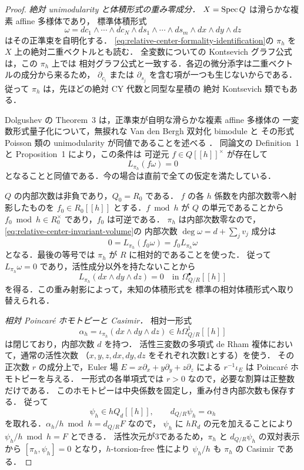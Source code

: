 \begin{proof}
\emph{絶対 unimodularity と体積形式の重み零成分．}
$X=\operatorname{Spec} Q$ は滑らかな複素 affine 多様体であり，
標準体積形式
\[
 \omega=dc_1\wedge\cdots\wedge dc_N
       \wedge ds_1\wedge\cdots\wedge ds_m
       \wedge dx\wedge dy\wedge dz
\]
はその正準束を自明化する．
\eqref{eq:relative-center-formality-identification}の $\pi_h$ を
$X$ 上の絶対二重ベクトルとも読む．
全変数についての Kontsevich グラフ公式は，この $\pi_h$ 上では
相対グラフ公式と一致する．各辺の微分添字は二重ベクトルの成分から来るため，
$\partial_{c_i}$ または $\partial_{s_j}$ を含む項が一つも生じないからである．
従って $\pi_h$ は，先ほどの絶対 CY 代数と同型な星積の
絶対 Kontsevich 類でもある．

Dolgushev の Theorem~3 は，正準束が自明な滑らかな複素 affine 多様体の
一変数形式量子化について，無捩れな Van den Bergh 双対化 bimodule と
その形式 Poisson 類の unimodularity が同値であることを述べる
\cite[Theorem~3]{DolgushevModular2009}．
同論文の Definition~1 と Proposition~1 により，この条件は
可逆元 $f\in Q[[h]]^\times$ が存在して
\begin{equation}\label{eq:relative-center-invariant-volume}
 L_{\pi_h}(f\omega)=0
\end{equation}
となることと同値である．今の場合は直前で全ての仮定を満たしている．

$Q$ の内部次数は非負であり，$Q_0=R_0$ である．
$f$ の各 $h$ 係数を内部次数零へ射影したものを
$f_0\in R_0[[h]]$ とする．$f\bmod h$ が $Q$ の単元であることから
$f_0\bmod h\in R_0^\times$ であり，$f_0$ は可逆である．
$\pi_h$ は内部次数零なので，\eqref{eq:relative-center-invariant-volume}の
内部次数 $\deg\omega=d+\sum_jv_j$ 成分は
\[
 0=L_{\pi_h}(f_0\omega)=f_0L_{\pi_h}\omega
\]
となる．最後の等号では $\pi_h$ が $R$ に相対的であることを使った．
従って $L_{\pi_h}\omega=0$ であり，活性成分以外を持たないことから
\[
 L_{\pi_h}(dx\wedge dy\wedge dz)=0
 \quad\text{in }\Omega^\bullet_{Q/R}[[h]]
\]
を得る．この重み射影によって，未知の体積形式を
標準の相対体積形式へ取り替えられる．

\emph{相対 Poincar\'e ホモトピーと Casimir．}
相対一形式
\[
 \alpha_h=\iota_{\pi_h}(dx\wedge dy\wedge dz)
     \in h\Omega^1_{Q/R}[[h]]
\]
は閉じており，内部次数 $d$ を持つ．
活性三変数の多項式 de Rham 複体において，通常の活性次数
（$x,y,z,dx,dy,dz$ をそれぞれ次数1とする）を使う．
その正次数 $r$ の成分上で，Euler 場
$E=x\partial_x+y\partial_y+z\partial_z$ による
$r^{-1}\iota_E$ は Poincar\'e ホモトピーを与える．
一形式の各単項式では $r>0$ なので，必要な割算は正整数だけである．
このホモトピーは中央係数を固定し，重み付き内部次数も保存する．
従って
\[
 \psi_h\in hQ_d[[h]],\qquad d_{Q/R}\psi_h=\alpha_h
\]
を取れる．$\alpha_h/h\bmod h=d_{Q/R}F$ なので，
$\psi_h$ に $hR_d$ の元を加えることにより
$\psi_h/h\bmod h=F$ とできる．
活性次元が3であるため，$\pi_h$ と $d_{Q/R}\psi_h$ の双対表示から
$[\pi_h,\psi_h]=0$ となり，$h$-torsion-free 性により
$\psi_h/h$ も $\pi_h$ の Casimir である．


\end{proof}
